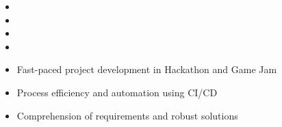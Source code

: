 
\begin{itemize}
\item[\faCommentsO] 
\item[\faCommentsO] 
\item[\faCommentsO] 
\item[\faCommentsO] \par
\end{itemize}

\bigskip
\medskip



\begin{itemize}
	\item[\faAngleRight] Fast-paced project development in Hackathon and Game Jam
	\item[\faAngleRight] Process efficiency and automation using CI/CD
	\item[\faAngleRight] Comprehension of requirements and robust solutions \par
\end{itemize}

\smallskip
\divider

\hfill
{}\hfill
{}\par
\smallskip
{}\hfill
{}\hfill
{}\hfill
{}\par

